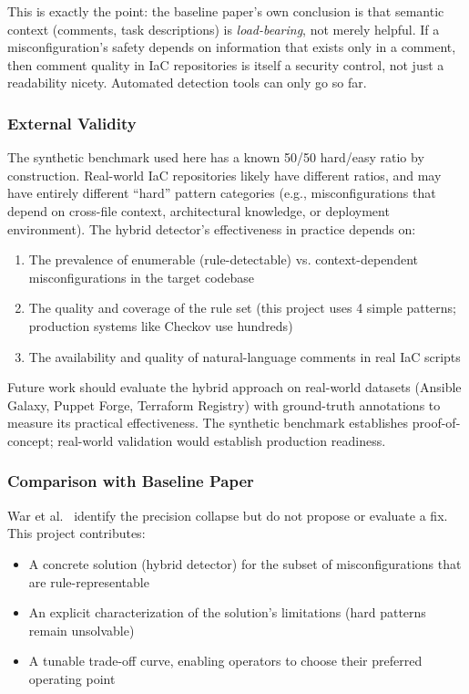 This is exactly the point: the baseline paper's own conclusion is that semantic context (comments, task descriptions) is \emph{load-bearing}, not merely helpful. If a misconfiguration's safety depends on information that exists only in a comment, then comment quality in IaC repositories is itself a security control, not just a readability nicety. Automated detection tools can only go so far.

\subsubsection{External Validity}

The synthetic benchmark used here has a known 50/50 hard/easy ratio by construction. Real-world IaC repositories likely have different ratios, and may have entirely different ``hard'' pattern categories (e.g., misconfigurations that depend on cross-file context, architectural knowledge, or deployment environment). The hybrid detector's effectiveness in practice depends on:

\begin{enumerate}
  \item The prevalence of enumerable (rule-detectable) vs. context-dependent misconfigurations in the target codebase
  \item The quality and coverage of the rule set (this project uses 4 simple patterns; production systems like Checkov use hundreds)
  \item The availability and quality of natural-language comments in real IaC scripts
\end{enumerate}

Future work should evaluate the hybrid approach on real-world datasets (Ansible Galaxy, Puppet Forge, Terraform Registry) with ground-truth annotations to measure its practical effectiveness. The synthetic benchmark establishes proof-of-concept; real-world validation would establish production readiness.

\subsubsection{Comparison with Baseline Paper}

War et al.~\cite{War25} identify the precision collapse but do not propose or evaluate a fix. This project contributes:
\begin{itemize}
  \item A concrete solution (hybrid detector) for the subset of misconfigurations that are rule-representable
  \item An explicit characterization of the solution's limitations (hard patterns remain unsolvable)
  \item A tunable trade-off curve, enabling operators to choose their preferred operating point
\end{itemize}

